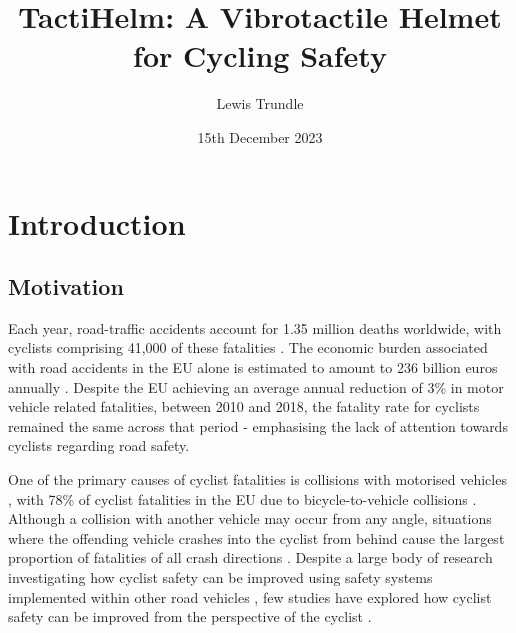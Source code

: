 \documentclass{interim}
\begin{document}
\title{TactiHelm: A Vibrotactile Helmet for Cycling Safety}
\author{Lewis Trundle}
\date{15th December 2023}
\maketitle

\tableofcontents
\newpage

\section{Introduction}\label{intro}
\subsection{Motivation}
Each year, road-traffic accidents account for 1.35 million deaths worldwide, with cyclists comprising 41,000 of these fatalities \cite{world2018global}. The economic burden associated with road accidents in the EU alone is estimated to amount to 236 billion euros annually \cite{costoftransport}. Despite the EU achieving an average annual reduction of 3\% in motor vehicle related fatalities, between 2010 and 2018, the fatality rate for cyclists remained the same across that period \cite{adminaite2020safe} - emphasising the lack of attention towards cyclists regarding road safety.

One of the primary causes of cyclist fatalities is collisions with motorised vehicles \cite{BIL20101632}, with 78\% of cyclist fatalities in the EU due to bicycle-to-vehicle collisions \cite{adminaite2015making}. Although a collision with another vehicle may occur from any angle, situations where the offending vehicle crashes into the cyclist from behind cause the largest proportion of fatalities of all crash directions \cite{BIL20101632}. Despite a large body of research investigating how cyclist safety can be improved using safety systems implemented within other road vehicles \cite{scholliers2014potential, SILLA2017134, cieslik2019improving, 7929602, 10.1145/3434770.3459732}, few studies have explored how cyclist safety can be improved from the perspective of the cyclist \cite{10.1145/3490099.3511127, STROHAEKER2022151}. 
\end{document}
